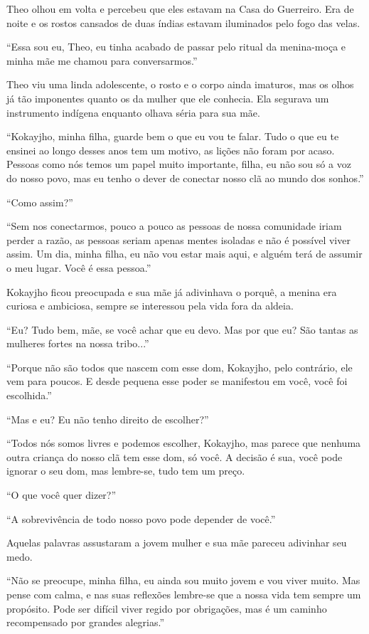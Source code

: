 Theo olhou em volta e percebeu que eles estavam na Casa do Guerreiro.
Era de noite e os rostos cansados de duas índias estavam iluminados pelo
fogo das velas.

``Essa sou eu, Theo, eu tinha acabado de passar pelo ritual da
menina-moça e minha mãe me chamou para conversarmos.''

Theo viu uma linda adolescente, o rosto e o corpo ainda imaturos, mas os
olhos já tão imponentes quanto os da mulher que ele conhecia. Ela
segurava um instrumento indígena enquanto olhava séria para sua mãe.

``Kokayjho, minha filha, guarde bem o que eu vou te falar. Tudo o que eu
te ensinei ao longo desses anos tem um motivo, as lições não foram por
acaso. Pessoas como nós temos um papel muito importante, filha, eu não
sou só a voz do nosso povo, mas eu tenho o dever de conectar nosso clã
ao mundo dos sonhos.''

``Como assim?''

``Sem nos conectarmos, pouco a pouco as pessoas de nossa comunidade
iriam perder a razão, as pessoas seriam apenas mentes isoladas e não é
possível viver assim. Um dia, minha filha, eu não vou estar mais aqui, e
alguém terá de assumir o meu lugar. Você é essa pessoa.''

Kokayjho ficou preocupada e sua mãe já adivinhava o porquê, a menina era
curiosa e ambiciosa, sempre se interessou pela vida fora da aldeia.

``Eu? Tudo bem, mãe, se você achar que eu devo. Mas por que eu? São
tantas as mulheres fortes na nossa tribo...''

``Porque não são todos que nascem com esse dom, Kokayjho, pelo
contrário, ele vem para poucos. E desde pequena esse poder se manifestou
em você, você foi escolhida.''

``Mas e eu? Eu não tenho direito de escolher?''

``Todos nós somos livres e podemos escolher, Kokayjho, mas parece que
nenhuma outra criança do nosso clã tem esse dom, só você. A decisão é
sua, você pode ignorar o seu dom, mas lembre-se, tudo tem um preço.

``O que você quer dizer?''

``A sobrevivência de todo nosso povo pode depender de você.''

Aquelas palavras assustaram a jovem mulher e sua mãe pareceu adivinhar
seu medo.

``Não se preocupe, minha filha, eu ainda sou muito jovem e vou viver
muito. Mas pense com calma, e nas suas reflexões lembre-se que a nossa
vida tem sempre um propósito. Pode ser difícil viver regido por
obrigações, mas é um caminho recompensado por grandes alegrias.''


